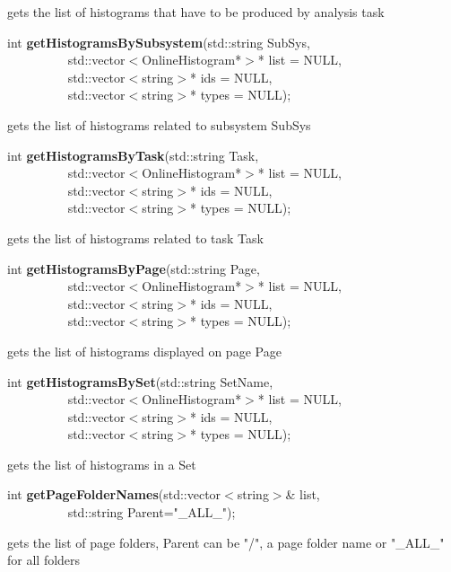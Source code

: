  gets the list of histograms that have to be produced by analysis task


\item    int {\bf getHistogramsBySubsystem}(std::string SubSys,\\\mbox{}~~~~~~~~~
			       std::vector$<$OnlineHistogram*$>$* list = NULL,\\\mbox{}~~~~~~~~~
			       std::vector$<$string$>$* ids = NULL,\\\mbox{}~~~~~~~~~
			       std::vector$<$string$>$* types = NULL);

 gets the list of histograms related to subsystem SubSys


\item    int {\bf getHistogramsByTask}(std::string Task,\\\mbox{}~~~~~~~~~
			  std::vector$<$OnlineHistogram*$>$* list = NULL,\\\mbox{}~~~~~~~~~
			  std::vector$<$string$>$* ids = NULL,\\\mbox{}~~~~~~~~~
			  std::vector$<$string$>$* types = NULL);

 gets the list of histograms related to task Task


\item    int {\bf getHistogramsByPage}(std::string Page,\\\mbox{}~~~~~~~~~
			  std::vector$<$OnlineHistogram*$>$* list = NULL,\\\mbox{}~~~~~~~~~
			  std::vector$<$string$>$* ids = NULL,\\\mbox{}~~~~~~~~~
			  std::vector$<$string$>$* types = NULL);

 gets the list of histograms displayed on page Page


\item    int {\bf getHistogramsBySet}(std::string SetName,\\\mbox{}~~~~~~~~~
			 std::vector$<$OnlineHistogram*$>$* list = NULL,\\\mbox{}~~~~~~~~~
			 std::vector$<$string$>$* ids = NULL,\\\mbox{}~~~~~~~~~
			 std::vector$<$string$>$* types = NULL);

 gets the list of histograms in a Set


\item    int {\bf getPageFolderNames}(std::vector$<$string$>$\& list,\\\mbox{}~~~~~~~~~ std::string Parent="\_ALL\_");


 gets the list of page folders, Parent can be "/", a page folder name or "\_ALL\_" for all folders  


